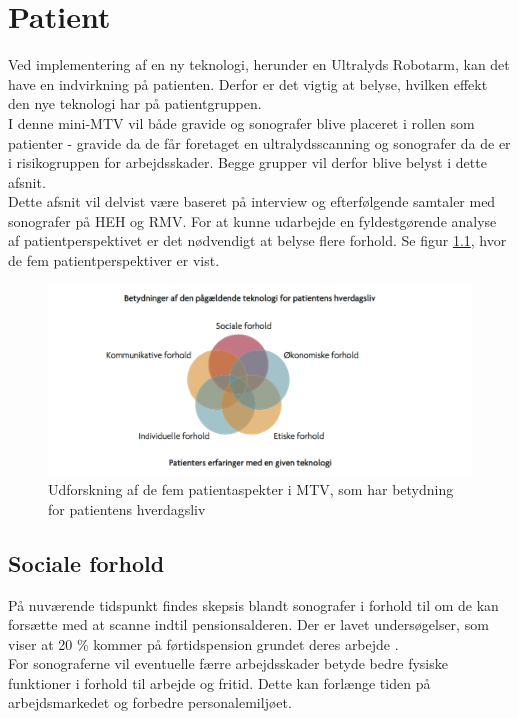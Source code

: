 \chapter{Patient}
Ved implementering af en ny teknologi, herunder en Ultralyds Robotarm, kan det have en indvirkning på patienten. Derfor er det vigtig at belyse, hvilken effekt den nye teknologi har på patientgruppen. \\
I denne mini-MTV vil både gravide og sonografer blive placeret i rollen som patienter - gravide da de får foretaget en ultralydsscanning og sonografer da de er i risikogruppen for arbejdsskader. Begge grupper vil derfor blive belyst i dette afsnit.  \\ \newline
Dette afsnit vil delvist være baseret på interview og efterfølgende samtaler med sonografer på HEH og RMV. 
\newline
For at kunne udarbejde en fyldestgørende analyse af patientperspektivet er det nødvendigt at belyse flere forhold. Se figur \ref{patientMTV}, hvor de fem patientperspektiver er vist. 
\begin{figure}[h!]\centering
	\includegraphics[width = 1.0\textwidth]{Figurer/PatientaspekterMTV}
	\caption{Udforskning af de fem patientaspekter i MTV, som har betydning for patientens hverdagsliv}
	\label{patientMTV}
\end{figure}

\section{Sociale forhold}
På nuværende tidspunkt findes skepsis blandt sonografer i forhold til om de kan forsætte med at scanne indtil pensionsalderen. Der er lavet undersøgelser, som viser at 20 \% kommer på førtidspension grundet deres arbejde \cite{BeckyMorton2007}.  \\ 
For sonograferne vil eventuelle færre arbejdsskader betyde bedre fysiske funktioner i forhold til arbejde og fritid. Dette kan forlænge tiden på arbejdsmarkedet og forbedre personalemiljøet.       

